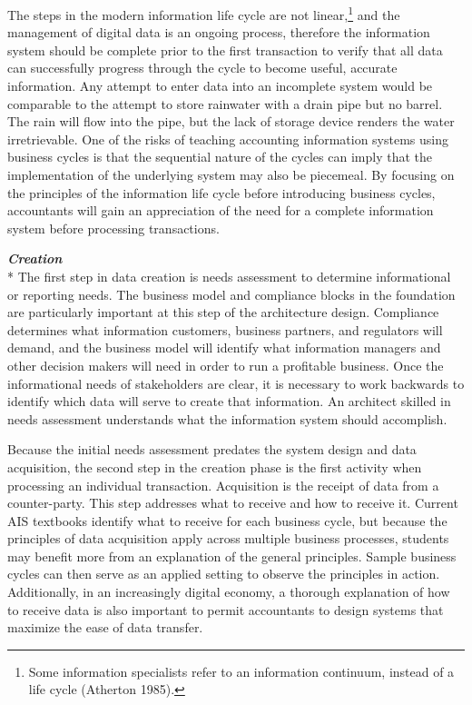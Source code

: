 \documentclass[12pt]{article}
\newcommand{\SubSubSection}[1]{{\centering{}\normalsize{}\textbf{\emph{#1}}}\\*\indent{}}
\begin{document}
The steps in the modern information life cycle are not linear,\footnote{Some information specialists refer to an information continuum, instead of a life cycle (Atherton 1985).} and the management of digital data is an ongoing process, therefore the information system should be complete prior to the first transaction to verify that all data can successfully progress through the cycle to become useful, accurate information. Any attempt to enter data into an incomplete system would be comparable to the attempt to store rainwater with a drain pipe but no barrel. The rain will flow into the pipe, but the lack of storage device renders the water irretrievable. One of the risks of teaching accounting information systems using business cycles is that the sequential nature of the cycles can imply that the implementation of the underlying system may also be piecemeal. By focusing on the principles of the information life cycle before introducing business cycles, accountants will gain an appreciation of the need for a complete information system before processing transactions.

\SubSubSection{Creation}
The first step in data creation is needs assessment to determine informational or reporting needs. The business model and compliance blocks in the foundation are particularly important at this step of the architecture design. Compliance determines what information customers, business partners, and regulators will demand, and the business model will identify what information managers and other decision makers will need in order to run a profitable business. Once the informational needs of stakeholders are clear, it is necessary to work backwards to identify which data will serve to create that information. An architect skilled in needs assessment understands what the information system should accomplish.

Because the initial needs assessment predates the system design and data acquisition, the second step in the creation phase is the first activity when processing an individual transaction. Acquisition is the receipt of data from a counter-party. This step addresses what to receive and how to receive it. Current AIS textbooks identify what to receive for each business cycle, but because the principles of data acquisition apply across multiple business processes, students may benefit more from an explanation of the general principles. Sample business cycles can then serve as an applied setting to observe the principles in action. Additionally, in an increasingly digital economy, a thorough explanation of how to receive data is also important to permit accountants to design systems that maximize the ease of data transfer.
\end{document}

